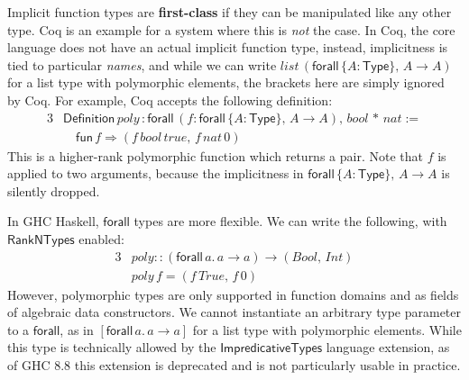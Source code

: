 \documentclass[acmsmall,review,anonymous,prologue,dvipsnames]{acmart}\settopmatter{printfolios=true,printccs=false,printacmref=false}
\newcommand{\kw}[1]{{\mathsf{#1}}}
\newcommand{\mi}[1]{\mathit{#1}}
\theoremstyle{remark}
\begin{document}
Implicit function types are \textbf{first-class} if they can be manipulated like any
other type. Coq is an example for a system where this is \emph{not} the case.
In Coq, the core language does not have an actual implicit function type,
instead, implicitness is tied to particular \emph{names}, and while we can write
$\mi{list}\,(\kw{forall}\,\{A : \kw{Type}\},\,A\to A)$ for a list type with
polymorphic elements, the brackets here are simply ignored by Coq. For example,
Coq accepts the following definition:
\begin{alignat*}{3}
  & \kw{Definition}\,poly\,: \kw{forall}\,(f : \kw{forall}\,\{A : \kw{Type}\},\,A\to A),\,\mi{bool}\,*\,\mi{nat} :=\\
  & \quad \kw{fun}\,f \Rightarrow (f\,\mi{bool}\,\mi{true},\,f\,\mi{nat}\,0)
\end{alignat*}
This is a higher-rank polymorphic function which returns a pair. Note that $f$
is applied to two arguments, because the implicitness in $\kw{forall}\,\{A :
\kw{Type}\},\,A\to A$ is silently dropped.

In GHC Haskell, $\kw{forall}$ types are more flexible. We can write the
following, with $\kw{RankNTypes}$ enabled:
\begin{alignat*}{3}
  & \mi{poly} :: (\kw{forall}\,a.\,a \to a) \to (\mi{Bool},\,\mi{Int}) \\
  & \mi{poly}\,f = (f\,\mi{True},\,f\,0)
\end{alignat*}
However, polymorphic types are only supported in function domains and as fields
of algebraic data constructors. We cannot instantiate an arbitrary type
parameter to a $\kw{forall}$, as in $[\kw{forall}\,a.\,a\to a]$ for a list type
with polymorphic elements. While this type is technically allowed by the
$\kw{ImpredicativeTypes}$ language extension, as of GHC 8.8 this extension is
deprecated and is not particularly usable in practice.
\end{document}
